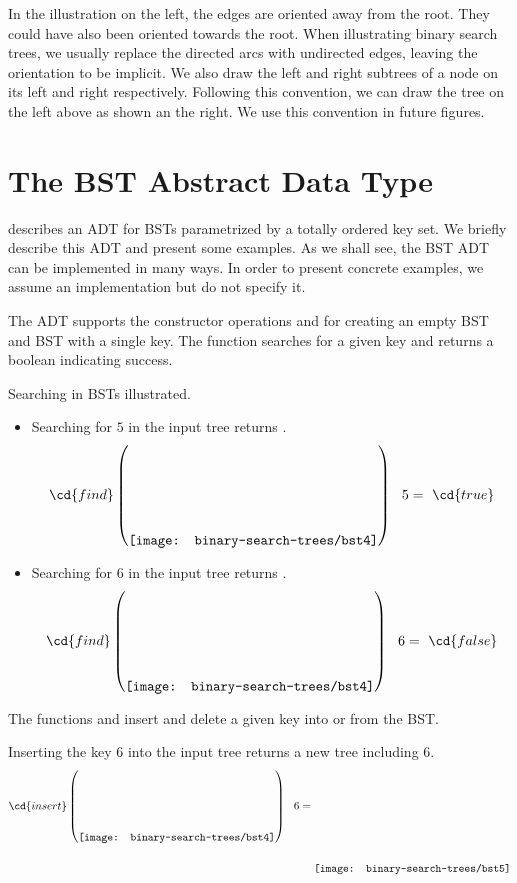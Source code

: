 \begin{chapter}
\begin{example}
\smallskip 

In the illustration on the left, the edges are oriented away from the
root. They could have also been oriented towards the root.
%
When illustrating binary search trees, we usually replace the directed
arcs with undirected edges, leaving the orientation to be implicit.
%
We also draw the left and right subtrees of a node on its left and
right respectively.
%
Following this convention, we can draw the tree on the left above as
shown an the right.
%
We use this convention in future figures.
\end{example}


\section{The BST Abstract Data Type}
\label{sec:bst::adt}

\newcommand{\bstt}{\tttt}


 describes an ADT for BSTs parametrized by a totally
ordered key set. We briefly describe this ADT and present some
examples. As we shall see, the BST ADT can be implemented in many
ways.  In order to present concrete examples, we assume an
implementation but do not specify it.




The ADT supports the constructor operations
 and  for creating an empty BST and BST
with a single key. 
%
The function  searches for a given key and returns a
boolean indicating success.
%
\begin{simpleexample}
Searching in BSTs illustrated.

\begin{itemize}
\item 
Searching for  $5$  in the input tree returns .
%
\[
\cd{find}
\left(
\raisebox{-.45in}{\texttt{[image: binary-search-trees/bst4]}}
\right) 
~~5
=
~\cd{true}
\]

\item 
Searching for  $6$  in the input tree returns .
%
\[
\cd{find}
\left(
\raisebox{-.45in}{\texttt{[image: binary-search-trees/bst4]}}
\right) 
~~6
= \
\cd{false}
\]

\end{itemize}
\end{simpleexample}


%
The functions  and  insert and delete a
given key into or from the BST.
%
\begin{example}
Inserting the key $6$  into the input tree returns a new tree including $6$.
%
\[
\cd{insert}
\left(
\raisebox{-10mm}{\texttt{[image: binary-search-trees/bst4]}}
\right) 
~~6
=
\raisebox{-20mm}{\texttt{[image: binary-search-trees/bst5]}}
\]
\end{example}


\end{chapter}
